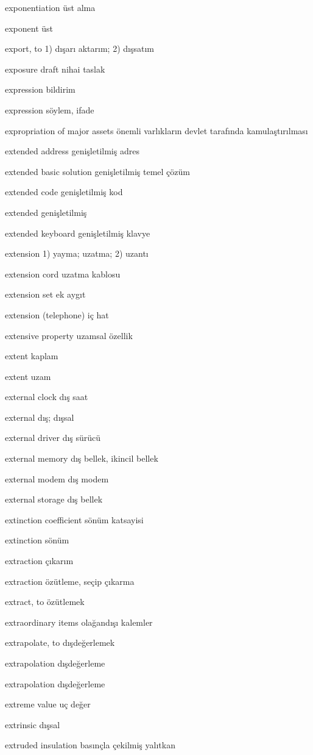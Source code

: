 \documentclass[12pt,fleqn]{article}\usepackage{../../common}
\begin{document}
exponentiation üst alma

exponent üst

export, to 1) dışarı aktarım; 2) dışsatım

exposure draft nihai taslak

expression bildirim

expression söylem, ifade

expropriation of major assets önemli varlıkların devlet tarafında kamulaştırılması

extended address genişletilmiş adres

extended basic solution genişletilmiş temel çözüm

extended code genişletilmiş kod

extended genişletilmiş

extended keyboard genişletilmiş klavye

extension 1) yayma; uzatma; 2) uzantı

extension cord uzatma kablosu

extension set ek aygıt

extension (telephone) iç hat

extensive property uzamsal özellik

extent kaplam

extent uzam

external clock dış saat

external dış; dışsal

external driver dış sürücü

external memory dış bellek, ikincil bellek

external modem dış modem

external storage dış bellek

extinction coefficient sönüm katsayisi

extinction sönüm

extraction çıkarım

extraction özütleme, seçip çıkarma

extract, to özütlemek

extraordinary items olağandışı kalemler

extrapolate, to dışdeğerlemek

extrapolation dışdeğerleme

extrapolation dışdeğerleme

extreme value uç değer

extrinsic dışsal

extruded insulation basınçla çekilmiş yalıtkan
\end{document}
